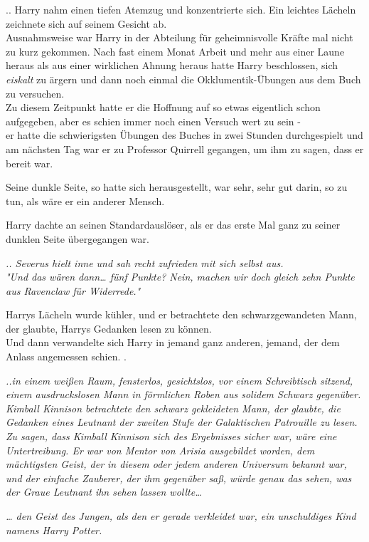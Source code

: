 {.. Harry nahm einen tiefen Atemzug und konzentrierte sich. Ein leichtes Lächeln zeichnete sich auf seinem Gesicht ab.\\ Ausnahmsweise war Harry in der Abteilung für geheimnisvolle Kräfte mal nicht zu kurz gekommen. Nach fast einem Monat Arbeit und mehr aus einer Laune heraus als aus einer wirklichen Ahnung heraus hatte Harry beschlossen, sich \emph{eiskalt} zu ärgern und dann noch einmal die Okklumentik-Übungen aus dem Buch zu versuchen.\\ Zu diesem Zeitpunkt hatte er die Hoffnung auf so etwas eigentlich schon aufgegeben, aber es schien immer noch einen Versuch wert zu sein -\\ er hatte die schwierigsten Übungen des Buches in zwei Stunden durchgespielt und am nächsten Tag war er zu Professor Quirrell gegangen, um ihm zu sagen, dass er bereit war.

Seine dunkle Seite, so hatte sich herausgestellt, war sehr, sehr gut darin, so zu tun, als wäre er ein anderer Mensch.

Harry dachte an seinen Standardauslöser, als er das erste Mal ganz zu seiner dunklen Seite übergegangen war.

\emph{.. Severus hielt inne und sah recht zufrieden mit sich selbst aus.\\ "Und das wären dann… fünf Punkte? Nein, machen wir doch gleich zehn Punkte aus Ravenclaw für Widerrede."}

Harrys Lächeln wurde kühler, und er betrachtete den schwarzgewandeten Mann, der glaubte, Harrys Gedanken lesen zu können.\\ Und dann verwandelte sich Harry in jemand ganz anderen, jemand, der dem Anlass angemessen schien. .

\emph{..in einem weißen Raum, fensterlos, gesichtslos, vor einem Schreibtisch sitzend, einem ausdruckslosen Mann in förmlichen Roben aus solidem Schwarz gegenüber.\\ Kimball Kinnison betrachtete den schwarz gekleideten Mann, der glaubte, die Gedanken eines Leutnant der zweiten Stufe der Galaktischen Patrouille zu lesen.\\ Zu sagen, dass Kimball Kinnison sich des Ergebnisses sicher war, wäre eine Untertreibung. Er war von Mentor von Arisia ausgebildet worden, dem mächtigsten Geist, der in diesem oder jedem anderen Universum bekannt war, und der einfache Zauberer, der ihm gegenüber saß, würde genau das sehen, was der Graue Leutnant ihn sehen lassen wollte…}

\emph{… den Geist des Jungen, als den er gerade verkleidet war, ein unschuldiges Kind namens Harry Potter.}

}
